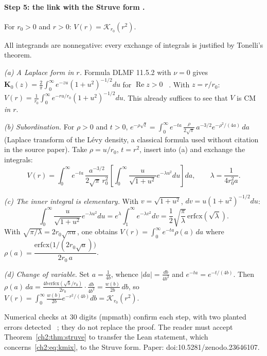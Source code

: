 \paragraph{Step 5: the link with the Struve form \tierC.}
\begin{theorem}\label{ch2:thm:struve}
For $r_0>0$ and $r>0$: $V(r)=\mathcal K_{r_0}(r^2)$.
\end{theorem}
\begin{humanproof}
All integrands are nonnegative: every exchange of integrals is justified by Tonelli's theorem.

\emph{(a) A Laplace form in $r$.} Formula DLMF 11.5.2 with $\nu=0$ gives
$\mathbf K_0(z)=\frac2\pi\int_0^\infty e^{-zu}(1+u^2)^{-1/2}du$ for $\operatorname{Re}z>0$ \tierL~\cite{ch2dlmf}. With
$z=r/r_0$: $V(r)=\frac1{r_0}\int_0^\infty e^{-ru/r_0}(1+u^2)^{-1/2}du$. This already suffices to see that $V$ is CM \emph{in $r$}.

\emph{(b) Subordination.} For $\rho>0$ and $t>0$,
$e^{-\rho\sqrt t}=\int_0^\infty e^{-ta}\,\frac{\rho}{2\sqrt\pi}\,a^{-3/2}e^{-\rho^2/(4a)}\,da$ (Laplace transform of
the Lévy density, a classical formula used without citation in the source paper). Take $\rho=u/r_0$, $t=r^2$,
insert into (a) and exchange the integrals:
\[V(r)=\int_0^\infty e^{-ta}\,\frac{a^{-3/2}}{2\sqrt\pi\,r_0^2}\left[\int_0^\infty\frac{u}{\sqrt{1+u^2}}e^{-\lambda u^2}du\right]da,
\qquad\lambda=\frac1{4r_0^2a}.\]

\emph{(c) The inner integral is elementary.} With $v=\sqrt{1+u^2}$, $dv=u(1+u^2)^{-1/2}du$:
\[\int_0^\infty\frac{u}{\sqrt{1+u^2}}e^{-\lambda u^2}du=e^{\lambda}\int_1^\infty e^{-\lambda v^2}dv
=\frac12\sqrt{\frac\pi\lambda}\,\mathrm{erfcx}(\sqrt\lambda).\]
With $\sqrt{\pi/\lambda}=2r_0\sqrt{\pi a}$, one obtains $V(r)=\int_0^\infty e^{-ta}\rho(a)\,da$ where
$\rho(a)=\dfrac{\mathrm{erfcx}\bigl(1/(2r_0\sqrt a)\bigr)}{2r_0\,a}$.

\emph{(d) Change of variable.} Set $a=\frac1{4b}$, whence $|da|=\frac{db}{4b^2}$ and $e^{-ta}=e^{-t/(4b)}$. Then
$\rho(a)\,da=\frac{4b\,\mathrm{erfcx}(\sqrt b/r_0)}{2r_0}\cdot\frac{db}{4b^2}=\frac{w(b)}{2b}\,db$, so
$V(r)=\int_0^\infty\frac{w(b)}{2b}e^{-r^2/(4b)}db=\mathcal K_{r_0}(r^2)$.
\end{humanproof}
\noindent Numerical checks at 30 digits (mpmath) confirm each step, with two planted errors
detected \tierX~\cite{ch2kel}; they do not replace the proof. The reader must accept
Theorem~\ref{ch2:thm:struve} to transfer the Lean statement, which concerns~\eqref{ch2:eq:kmix}, to the Struve form.
Paper: doi\string:10.5281/zenodo.23646107.

